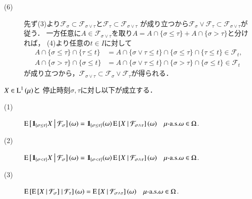 \begin{prf}
\begin{description}
			\item[(6)] 
				先ず(3)より$\mathcal{F}_\sigma \subset \mathcal{F}_{\sigma \vee \tau}$と$\mathcal{F}_\tau \subset \mathcal{F}_{\sigma \vee \tau}$
				が成り立つから$\mathcal{F}_\sigma \vee \mathcal{F}_\tau \subset \mathcal{F}_{\sigma \vee \tau}$が従う．
				一方任意に$A \in \mathcal{F}_{\sigma \vee \tau}$を取り$A = A \cap \{ \sigma \leq \tau \} + A \cap \{ \sigma > \tau \}$と分ければ，
				(4)より任意の$t \in I$に対して
				\begin{align}
					A \cap \{ \sigma \leq \tau \} \cap \{ \tau \leq t \}
					&= A \cap \{\sigma \vee \tau \leq t\} \cap \{ \sigma \leq \tau \} \cap \{ \tau \leq t \} \in \mathcal{F}_t, \\
					A \cap \{ \sigma > \tau \} \cap \{ \sigma \leq t \}
					&= A \cap \{\sigma \vee \tau \leq t\} \cap \{ \sigma > \tau \} \cap \{ \sigma \leq t \} \in \mathcal{F}_t
				\end{align}
				が成り立つから，$ \mathcal{F}_{\sigma \vee \tau} \subset \mathcal{F}_\sigma \vee \mathcal{F}_\tau$が得られる．
				\QED
		\end{description}
	\end{prf}
	
	\begin{screen}
		\begin{prp}[停止時刻と条件付き期待値]
			$X \in \operatorname{L}^{1} \left(\operatorname{\mu}\right)$と
			停止時刻$\sigma, \tau$に対し以下が成立する．
			\begin{description}
				\item[(1)] $\operatorname{E} \left[ \mbox{1}\hspace{-0.25em}\mbox{l}_{\{\sigma \leq \tau\}} X \ \middle|\ \mathcal{F}_\sigma \right](\omega) 
					= \mbox{1}\hspace{-0.25em}\mbox{l}_{\{\sigma \leq \tau\}}(\omega) \operatorname{E} \left[ X \ \middle|\ \mathcal{F}_{\sigma \wedge \tau} \right](\omega) 
					\quad \mbox{$\mu$-a.s.}\omega \in \Omega$.
				\item[(2)] $\operatorname{E} \left[ \mbox{1}\hspace{-0.25em}\mbox{l}_{\{\sigma < \tau\}} X \ \middle|\ \mathcal{F}_\sigma \right](\omega) 
					= \mbox{1}\hspace{-0.25em}\mbox{l}_{\{\sigma < \tau\}}(\omega) \operatorname{E} \left[ X \ \middle|\ \mathcal{F}_{\sigma \wedge \tau} \right](\omega) 
					\quad \mbox{$\mu$-a.s.}\omega \in \Omega$.
				\item[(3)] $\operatorname{E} \left[ \operatorname{E} \left[ X \ \middle|\ \mathcal{F}_\sigma \right] \ \middle|\ \mathcal{F}_\tau \right](\omega) = \operatorname{E} \left[ X \ \middle|\ \mathcal{F}_{\sigma \wedge \tau} \right](\omega)
					\quad \mbox{$\mu$-a.s.}\omega \in \Omega$.
			\end{description}
			\label{prp:stopping_time_and_conditional_expectation}
		\end{prp}
	\end{screen}
	
